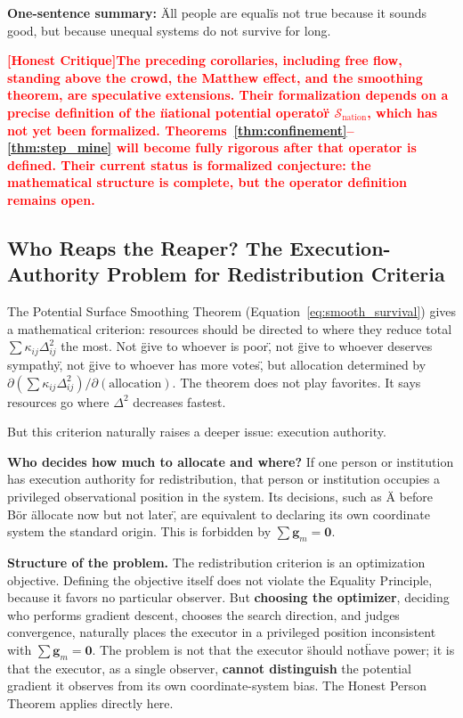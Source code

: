 \documentclass[12pt,a4paper]{article}
\theoremstyle{remark}
\newcommand{\honestcrit}[1]{%
    \textcolor{red}{\textbf{[Honest Critique]#1}}%
}
\begin{document}
\textbf{One-sentence summary:} \"All people are equal\" is not true because it sounds good, but because unequal systems do not survive for long.

\honestcrit{The preceding corollaries, including free flow, standing above the crowd, the Matthew effect, and the smoothing theorem, are speculative extensions. Their formalization depends on a precise definition of the \"national potential operator\" $\mathcal{S}_{\text{nation}}$, which has not yet been formalized. Theorems~\ref{thm:confinement}--\ref{thm:step_mine} will become fully rigorous after that operator is defined. Their current status is formalized conjecture: the mathematical structure is complete, but the operator definition remains open.}

\subsection{Who Reaps the Reaper? The Execution-Authority Problem for Redistribution Criteria}

The Potential Surface Smoothing Theorem (Equation~\ref{eq:smooth_survival}) gives a mathematical criterion: resources should be directed to where they reduce total $\sum\kappa_{ij}\Delta_{ij}^2$ the most. Not \"give to whoever is poor\", not \"give to whoever deserves sympathy\", not \"give to whoever has more votes\", but allocation determined by $\partial(\sum\kappa_{ij}\Delta_{ij}^2)/\partial(\text{allocation})$. The theorem does not play favorites. It says resources go where $\Delta^2$ decreases fastest.

But this criterion naturally raises a deeper issue: execution authority.

\textbf{Who decides how much to allocate and where?} If one person or institution has execution authority for redistribution, that person or institution occupies a privileged observational position in the system. Its decisions, such as \"A before B\" or \"allocate now but not later\", are equivalent to declaring its own coordinate system the standard origin. This is forbidden by $\sum\mathbf{g}_m=\mathbf{0}$.

\textbf{Structure of the problem.} The redistribution criterion is an optimization objective. Defining the objective itself does not violate the Equality Principle, because it favors no particular observer. But \textbf{choosing the optimizer}, deciding who performs gradient descent, chooses the search direction, and judges convergence, naturally places the executor in a privileged position inconsistent with $\sum\mathbf{g}_m=\mathbf{0}$. The problem is not that the executor \"should not\" have power; it is that the executor, as a single observer, \textbf{cannot distinguish} the potential gradient it observes from its own coordinate-system bias. The Honest Person Theorem applies directly here.
\end{document}
